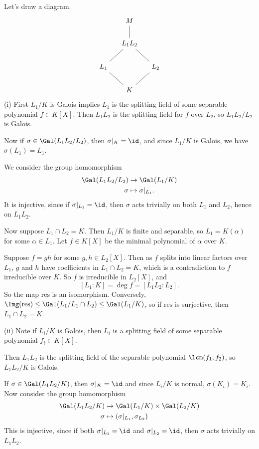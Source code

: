 \documentclass[12pt]{article}
\begin{document}
\begin{proofbox}
	Let's draw a diagram.
	\[
	\begin{tikzcd}[column sep = small]
		& M \arrow[d, dash] & \\
		& L_1L_2 \arrow[dl, dash] \arrow[dr, dash] & \\
		L_1 \arrow[dr, dash] & & L_2 \arrow[dl, dash] \\
				     & K &
	\end{tikzcd}
	\]
	(i) First $L_1/K$ is Galois implies $L_1$ is the splitting field of some separable polynomial $f \in K[X]$. Then $L_1L_2$ is the splitting field for $f$ over $L_2$, so $L_1L_2/L_2$ is Galois.

	Now if $\sigma \in \Gal(L_1L_2/L_2)$, then $\sigma|_K = \id$, and since $L_1/K$ is Galois, we have $\sigma(L_1) = L_1$.

	We consider the group homomorphism
	\begin{align*}
		\Gal(L_1L_2/L_2) &\to \Gal(L_1/K) \\
		\sigma &\mapsto \sigma|_{L_1}.
	\end{align*}
	It is injective, since if $\sigma|_{L_1} = \id$, then $\sigma$ acts trivially on both $L_1$ and $L_2$, hence on $L_1L_2$.

	Now suppose $L_1 \cap L_2 = K$. Then $L_1/K$ is finite and separable, so $L_1 = K(\alpha)$ for some $\alpha \in L_1$. Let $f \in K[X]$ be the minimal polynomial of $\alpha$ over $K$.

	Suppose $f = gh$ for some $g, h \in L_2[X]$. Then as $f$ splits into linear factors over $L_1$, $g$ and $h$ have coefficients in $L_1 \cap L_2 = K$, which is a contradiction to $f$ irreducible over $K$. So $f$ is irreducible in $L_2[X]$, and
	\[
		[L_1 : K] = \deg f = [L_1 L_2: L_2].
	\]
	So the map $\mathrm{res}$ is an isomorphism. Conversely, $\Img(\mathrm{res}) \le \Gal(L_1/L_1 \cap L_2) \leq \Gal(L_1/K)$, so if $\mathrm{res}$ is surjective, then $L_1 \cap L_2 = K$.

	(ii) Note if $L_i/K$ is Galois, then $L_i$ is a splitting field of some separable polynomial $f_i \in K[X]$.

	Then $L_1L_2$ is the splitting field of the separable polynomial $\lcm(f_1, f_2)$, so $L_1L_2/K$ is Galois.

	If $\sigma \in \Gal(L_1L_2/K)$, then $\sigma|_K = \id$ and since $L_i/K$ is normal, $\sigma(K_i) = K_i$. Now consider the group homomorphism
	\begin{align*}
		\Gal(L_1L_2/K) &\to \Gal(L_1/K) \times \Gal(L_2/K) \\
		\sigma &\mapsto (\sigma|_{L_1}, \sigma_{L_2})
	\end{align*}
	This is injective, since if both $\sigma|_{L_1} = \id$ and $\sigma|_{L_2} = \id$, then $\sigma$ acts trivially on $L_1L_2$.


\end{proofbox}
\end{document}
